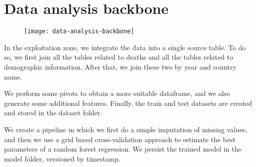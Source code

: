 

\section{Data analysis backbone}

\begin{figure}[H]
    \texttt{[image: data-analysis-backbone]}
\end{figure}

In the exploitation zone, we integrate the data into a single source table. To do so, we first join all the tables related to deaths and all the tables related to demographic information. After that, we join these two by year and country name.

We perform some pivots to obtain a more suitable dataframe, and we also generate some additional features. Finally, the train and test datasets are created and stored in the dataset folder.

We create a pipeline in which we first do a simple imputation of missing values, and then we use a grid based cross-validation approach to estimate the best parameters of a random forest regression. We persist the trained model in the model folder, versioned by timestamp.